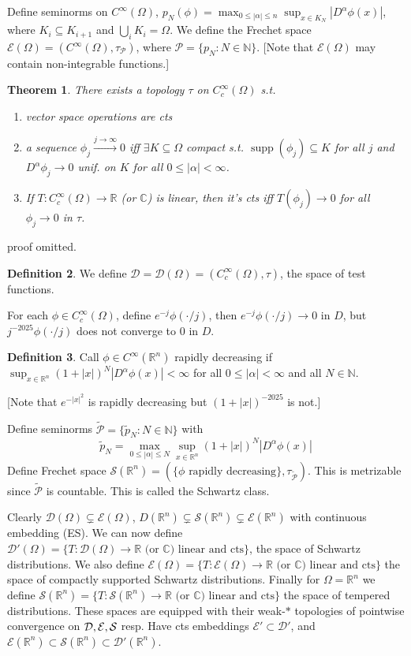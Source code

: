 \documentclass{article}
\theoremstyle{definition}
\newtheorem{defn}{Definition}[section]
\theoremstyle{remark}
\theoremstyle{plain}
\newtheorem{thm}[defn]{Theorem}
\newcommand{\NN}{\mathbb{N}}
\newcommand{\RR}{\mathbb{R}}
\newcommand{\CC}{\mathbb{C}}
\newcommand{\calD}{\mathcal{D}}
\begin{document}
Define seminorms on $C^\infty(\Omega)$, $p_N(\phi)=\max_{0\le |\alpha|\le n}\sup_{x\in K_N}|D^\alpha\phi(x)|$, where $K_i\subseteq K_{i+1}$ and $\bigcup _iK_i=\Omega$. We define the Frechet space $\mathcal E(\Omega)=(C^\infty(\Omega),\tau_{\mathcal P})$, where $\mathcal P=\{p_N:N\in\NN\}$. [Note that $\mathcal E(\Omega)$ may contain non-integrable functions.] 

\begin{thm}
    There exists a topology $\tau$ on $C^\infty_c(\Omega)$ s.t.
    \begin{enumerate}[(1)]
        \item vector space operations are cts
        \item a sequence $\phi_j\overset{j\to\infty}{\to} 0$ iff $\exists K\subseteq\Omega$ compact s.t. $\operatorname{supp}(\phi_j)\subseteq K$ for all $j$ and $D^\alpha\phi_j\to 0$ unif. on $K$ for all $0\le |\alpha|<\infty$.
        \item If $T:C^\infty_c(\Omega)\to\RR$ (or $\CC$) is linear, then it's cts iff $T(\phi_j)\to 0$ for all $\phi_j\to 0$ in $\tau$.
    \end{enumerate}
\end{thm}
proof omitted.

\begin{defn}
    We define $\calD=\calD(\Omega)=(C^\infty_c(\Omega),\tau)$, the space of test functions.
\end{defn}
For each $\phi\in C^\infty_c(\Omega)$, define $e^{-j}\phi(\cdot/j)$, then $e^{-j}\phi(\cdot/j)\to 0$ in $D$, but $j^{-2025}\phi(\cdot/j)$ does not converge to $0$ in $D$.

\begin{defn}
    Call $\phi\in C^\infty(\RR^n)$ rapidly decreasing if $\sup_{x\in\RR^n}(1+|x|)^N|D^\alpha\phi(x)|<\infty$ for all $0\le|\alpha|<\infty$ and all $N\in\NN$.
\end{defn}
[Note that $e^{-|x|^2}$ is rapidly decreasing but $(1+|x|)^{-2025}$ is not.]

Define seminorms $\tilde{\mathcal P}=\{\tilde p_N:N\in\NN\}$ with 
\[\tilde p_N=\max_{0\le|\alpha|\le N}\sup_{x\in \RR^n}(1+|x|)^N|D^{\alpha}\phi(x)|\]
Define Frechet space $\mathcal{S}(\RR^n)=(\{\phi\text{ rapidly decreasing}\},\tau_{\tilde{\mathcal P}})$.
This is metrizable since $\tilde{\mathcal P}$ is countable. This is called the Schwartz class.

Clearly $\calD(\Omega)\subsetneq \mathcal E(\Omega)$, $D(\RR^n)\subsetneq\mathcal S(\RR^n)\subsetneq\mathcal E(\RR^n)$ with continuous embedding (ES). We can now define $\calD'(\Omega)=\{T:\calD(\Omega)\to\RR\text{ (or $\CC$) linear and cts}\}$, the space of Schwartz distributions.
We also define $\mathcal E(\Omega)=\{T:\mathcal E(\Omega)\to \RR\text{ (or $\CC$) linear and cts}\}$ the space of compactly supported Schwartz distributions. Finally for $\Omega=\RR^n$ we define
$\mathcal S(\RR^n)=\{T:\mathcal S(\RR^n)\to\RR\text{ (or $\CC$) linear and cts}\}$ the space of tempered distributions. These spaces are equipped with their weak-$\ast$ topologies of pointwise convergence on $\cal D,\mathcal E,\mathcal S$ resp. Have cts embeddings
$\mathcal E'\subset\mathcal D'$, and $\mathcal E(\RR^n)\subset \mathcal S(\RR^n)\subset \calD'(\RR^n)$.
\end{document}
